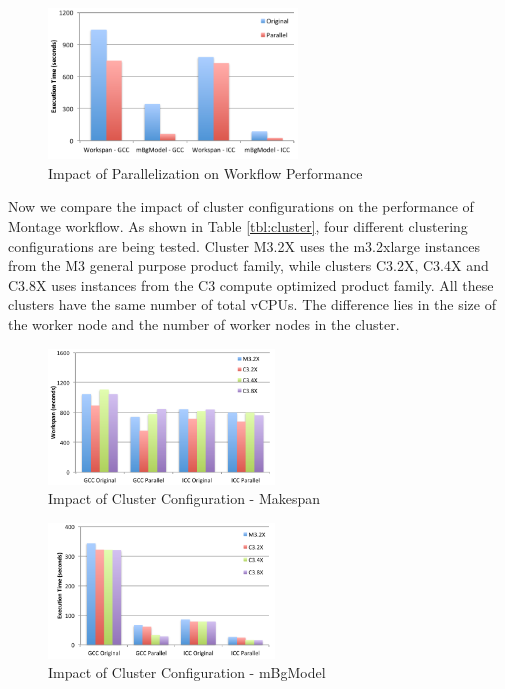 \begin{figure}[t!]
\centering
\includegraphics[height=4cm]{fig02}
\vspace{-5pt}
\caption{Impact of Parallelization on Workflow Performance}
\vspace{-10pt}
\label{fig:parallel}
\end{figure}


Now we compare the impact of cluster configurations on the performance of Montage workflow. As shown in Table \ref{tbl:cluster}, four different clustering configurations are being tested.  Cluster M3.2X uses the m3.2xlarge instances from the M3 general purpose product family, while clusters C3.2X, C3.4X and C3.8X uses instances from the C3 compute optimized product family. All these clusters have the same number of total vCPUs. The difference lies in the size of the worker node and the number of worker nodes in the cluster.


\begin{figure}[t!]
\centering
\includegraphics[width=6cm]{fig03}
\caption{Impact of Cluster Configuration - Makespan}
\label{fig:cluster}
\end{figure}

\begin{figure}[t!]
\centering
\includegraphics[width=6cm]{fig04}
\caption{Impact of Cluster Configuration - mBgModel}
\label{fig:mBgModel}
\end{figure}

